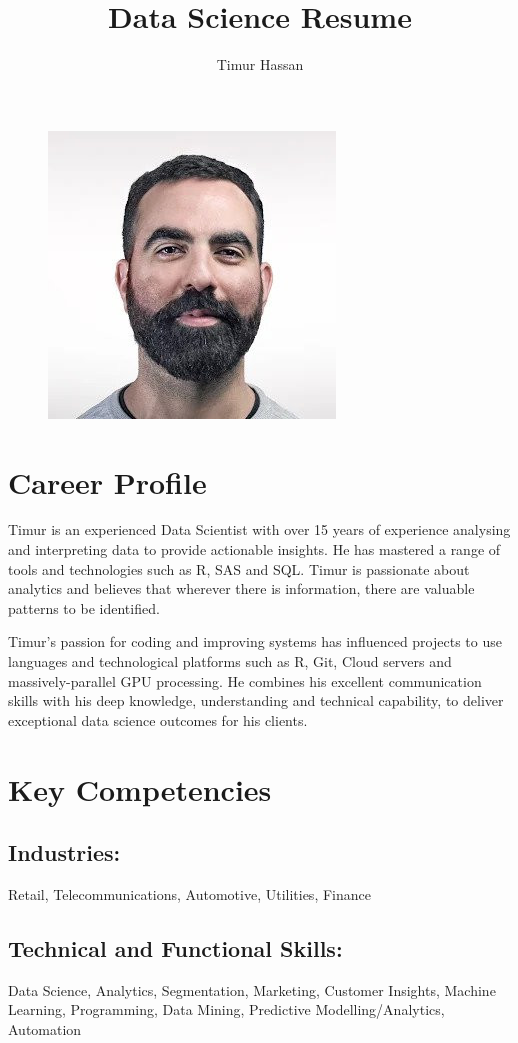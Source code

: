 \documentclass{article}
\begin{document}
\begin{figure}[t!]
    \includegraphics[width=.2\linewidth]{portrait.jpg}
\end{figure}

\author{Timur Hassan}
\title{Data Science Resume}


\maketitle

\section{Career Profile}
Timur is an experienced Data Scientist with over 15 years of experience analysing and interpreting data to provide actionable insights. He has mastered a range of tools and technologies such as R, SAS and SQL. Timur is passionate about analytics and believes that wherever there is information, there are valuable patterns to be identified.

Timur's passion for coding and improving systems has influenced projects to use languages and technological platforms such as R, Git, Cloud servers and massively-parallel GPU
processing. He combines his excellent communication skills with his deep knowledge, understanding and technical capability, to deliver exceptional data science outcomes for his clients.

\section{Key Competencies}
\subsection{Industries:}
Retail, Telecommunications, Automotive, Utilities, Finance

\subsection{Technical and Functional Skills:}
Data Science, Analytics, Segmentation, Marketing, Customer Insights, Machine Learning, Programming, Data Mining, Predictive Modelling/Analytics, Automation
\end{document}
